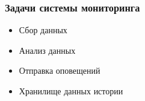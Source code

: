 \begin{frame}[fragile]
    \frametitle{Задачи системы мониторинга}
        \begin{itemize}
            \item Сбор данных
            \item Анализ данных
            \item Отправка оповещений
            \item Хранилище данных истории
        \end{itemize}
\end{frame}